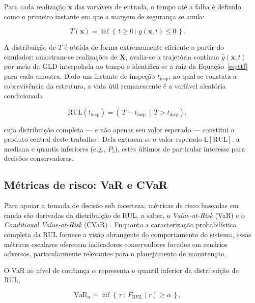 Para cada realização $\mathbf{x}$ das variáveis de entrada, o tempo até a falha é definido como o primeiro instante em que a margem de segurança se anula:

\begin{equation}
T(\mathbf{x}) = \inf\left\{\, t \geq 0 \,:\, g(\mathbf{x}, t) \leq 0 \,\right\}.
\label{eq:ttf}
\end{equation}

A distribuição de $T$ é obtida de forma extremamente eficiente a partir do emulador: amostram-se realizações de $\mathbf{X}$, avalia-se a trajetória contínua $\hat{g}(\mathbf{x}, t)$ por meio da GLD interpolada no tempo e identifica-se a raiz da Equação~\eqref{eq:ttf} para cada amostra. Dado um instante de inspeção $t_{\mathrm{insp}}$, no qual se constata a sobrevivência da estrutura, a vida útil remanescente é a variável aleatória condicionada

\begin{equation}
\mathrm{RUL}(t_{\mathrm{insp}}) = \left(\, T - t_{\mathrm{insp}} \,\middle|\, T > t_{\mathrm{insp}} \right),
\label{eq:rul}
\end{equation}

\noindent cuja distribuição completa --- e não apenas seu valor esperado --- constitui o produto central deste trabalho \citep{si2011}. Dela extraem-se o valor esperado $\mathbb{E}[\mathrm{RUL}]$, a mediana e quantis inferiores (e.g., $P_5$), estes últimos de particular interesse para decisões conservadoras.

\subsection{Métricas de risco: VaR e CVaR}
\label{subsec:var_cvar}

Para apoiar a tomada de decisão sob incerteza, métricas de risco baseadas em cauda são derivadas da distribuição de RUL, a saber, o \textit{Value-at-Risk} (VaR) e o \textit{Conditional Value-at-Risk} (CVaR) \citep{rockafellar2000}. Enquanto a caracterização probabilística completa da RUL fornece a visão abrangente do comportamento do sistema, essas métricas escalares oferecem indicadores conservadores focados em cenários adversos, particularmente relevantes para o planejamento de manutenção.

O VaR ao nível de confiança $\alpha$ representa o quantil inferior da distribuição de RUL,

\begin{equation}
\mathrm{VaR}_\alpha = \inf\left\{\, r \,:\, F_{\mathrm{RUL}}(r) \geq \alpha \,\right\},
\label{eq:var}
\end{equation}

